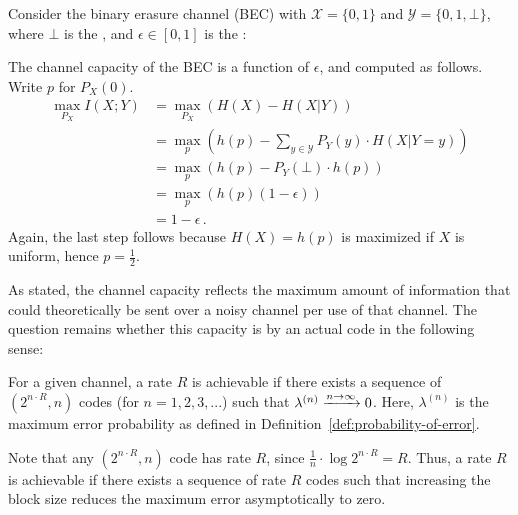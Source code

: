 \begin{example}
Consider the binary erasure channel (BEC) with $\mathcal{X} = \{0,1\}$ and $\mathcal{Y} = \{0,1,\bot\}$, where $\bot$ is the , and $\epsilon \in [0,1]$ is the :
\begin{center}
\end{center} 
The channel capacity of the BEC is a function of $\epsilon$, and computed as follows. Write $p$ for $P_X(0)$.
\begin{align*}
\max_{P_X} I(X;Y) &= \max_{P_X} \left( H(X) - H(X|Y)\right)\\
&= \max_{p} \left( h(p) - \sum_{y \in \mathcal{Y}} P_Y(y) \cdot H(X|Y=y)\right)\\
&= \max_{p} \left( h(p) - P_Y(\bot) \cdot h(p)\right)\\
&= \max_{p} \left( h(p) (1-\epsilon)\right)\\
&= 1 - \epsilon \, .
\end{align*}
Again, the last step follows because $H(X)=h(p)$ is maximized if $X$ is uniform, hence $p=\frac12$.
\end{example}
As stated, the channel capacity reflects the maximum amount of information that could theoretically be sent over a noisy channel per use of that channel. The question remains whether this capacity is  by an actual code in the following sense:

\begin{definition}
For a given channel, a rate $R$ is achievable if there exists a sequence of $(2^{n \cdot R},n)$ codes (for $n = 1,2,3,...$) such that $\lambda^{(n)} \xrightarrow{n \to \infty} 0$. Here, $\lambda^{(n)}$ is the maximum error probability as defined in Definition~\ref{def:probability-of-error}.
\end{definition}
Note that any $(2^{n \cdot R},n)$ code has rate $R$, since $\frac{1}{n} \cdot \log {2^{n \cdot R}} = R$. Thus, a rate $R$ is achievable if there exists a sequence of rate $R$ codes such that increasing the block size reduces the maximum error asymptotically to zero.

